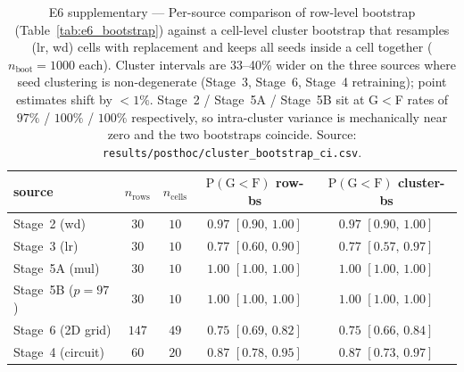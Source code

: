 \documentclass{article}
\begin{document}
\begin{table}[tbp]
  \centering
  \caption{E6 supplementary --- Per-source comparison of row-level
    bootstrap (Table~\ref{tab:e6_bootstrap}) against a cell-level
    cluster bootstrap that resamples (lr, wd) cells with replacement
    and keeps all seeds inside a cell together
    ($n_{\mathrm{boot}}{=}1000$ each).
    Cluster intervals are 33--40\% wider on the three sources where
    seed clustering is non-degenerate (Stage~3, Stage~6, Stage~4
    retraining); point estimates shift by $<1\%$.
    Stage~2 / Stage~5A / Stage~5B sit at G$<$F rates of
    $97\%$ / $100\%$ / $100\%$ respectively, so intra-cluster variance
    is mechanically near zero and the two bootstraps coincide.
    Source: \texttt{results/posthoc/cluster\_bootstrap\_ci.csv}.}
  \label{tab:cluster_bootstrap}
  \small
  \begin{tabular}{lcccc}
    \toprule
    source & $n_{\mathrm{rows}}$ & $n_{\mathrm{cells}}$ &
    $\mathrm{P}(\mathrm{G}{<}\mathrm{F})$ row-bs &
    $\mathrm{P}(\mathrm{G}{<}\mathrm{F})$ cluster-bs \\
    \midrule
    Stage~2 (wd)       & $30$  & $10$ & $0.97$ $[0.90,\,1.00]$ & $0.97$ $[0.90,\,1.00]$ \\
    Stage~3 (lr)       & $30$  & $10$ & $0.77$ $[0.60,\,0.90]$ & $0.77$ $[0.57,\,0.97]$ \\
    Stage~5A (mul)     & $30$  & $10$ & $1.00$ $[1.00,\,1.00]$ & $1.00$ $[1.00,\,1.00]$ \\
    Stage~5B ($p{=}97$)& $30$  & $10$ & $1.00$ $[1.00,\,1.00]$ & $1.00$ $[1.00,\,1.00]$ \\
    Stage~6 (2D grid)  & $147$ & $49$ & $0.75$ $[0.69,\,0.82]$ & $0.75$ $[0.66,\,0.84]$ \\
    Stage~4 (circuit)  & $60$  & $20$ & $0.87$ $[0.78,\,0.95]$ & $0.87$ $[0.73,\,0.97]$ \\
    \bottomrule
  \end{tabular}
\end{table}
\end{document}
